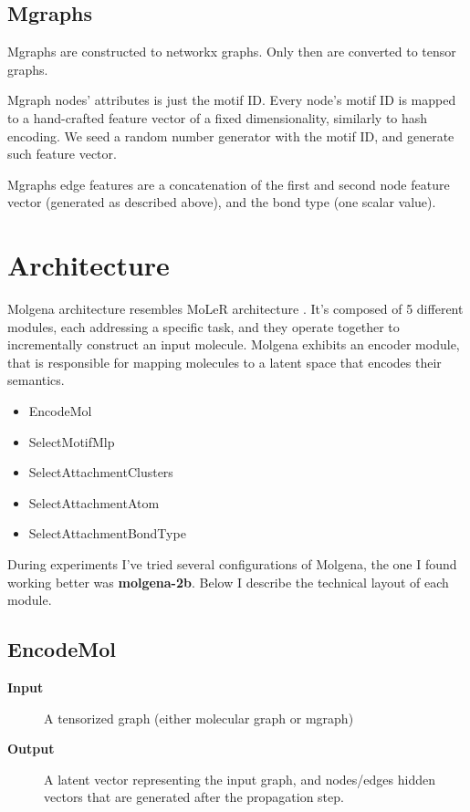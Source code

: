 \documentclass{article}
\begin{document}
\subsection{Mgraphs}

Mgraphs are constructed to networkx graphs.
Only then are converted to tensor graphs.

Mgraph nodes' attributes is just the motif ID.
Every node's motif ID is mapped to a hand-crafted feature vector of a fixed dimensionality, similarly to hash encoding.
We seed a random number generator with the motif ID, and generate such feature vector.

Mgraphs edge features are a concatenation of the first and second node feature vector (generated as described above), and the bond type (one scalar value).

\section{Architecture}

Molgena architecture resembles MoLeR architecture \cite{microsoft2024}.
It's composed of 5 different modules, each addressing a specific task, and they operate together to incrementally construct an input molecule.
Molgena exhibits an encoder module, that is responsible for mapping molecules to a latent space that encodes their semantics.

\begin{itemize}
\item EncodeMol
\item SelectMotifMlp
\item SelectAttachmentClusters
\item SelectAttachmentAtom
\item SelectAttachmentBondType
\end{itemize}

During experiments I've tried several configurations of Molgena, the one I found working better was \textbf{molgena-2b}.
Below I describe the technical layout of each module.

\subsection{EncodeMol}

\begin{description}
\item[\textbf{Input}]
    A tensorized graph (either molecular graph or mgraph)
\item[\textbf{Output}]
    A latent vector representing the input graph,
    and nodes/edges hidden vectors that are generated after the propagation step.
\end{description}
\end{document}
